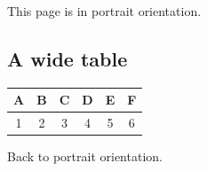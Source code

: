 \documentclass{article}
\begin{document}
This page is in portrait orientation.
\begin{landscape}
\section*{A wide table}
\begin{tabular}{|c|c|c|c|c|c|}
\hline
A & B & C & D & E & F \\
\hline
1 & 2 & 3 & 4 & 5 & 6 \\
\hline
\end{tabular}
\end{landscape}
Back to portrait orientation.
\end{document}
